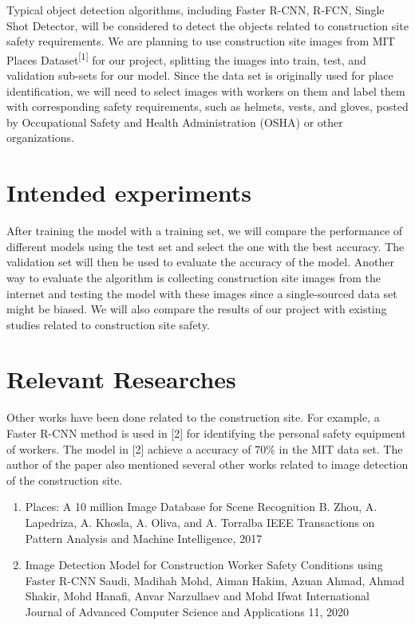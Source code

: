 \documentclass[pdflatex,sn-mathphys]{sn-jnl}%
\begin{document}
Typical object detection algorithms, including Faster R-CNN, R-FCN, Single Shot Detector, will be considered to detect the objects related to construction site safety requirements. We are planning to use construction site images from MIT Places Dataset\textsuperscript{[1]} for our project, splitting the images into train, test, and validation sub-sets for our model. Since the data set is originally used for place identification, we will need to select images with workers on them and label them with corresponding safety requirements, such as helmets, vests, and gloves, posted by Occupational Safety and Health Administration (OSHA) or other organizations. 

\section{Intended experiments}\label{sec3}

 After training the model with a training set, we will compare the performance of different models using the test set and select the one with the best accuracy. The validation set will then be used to evaluate the accuracy of the model. Another way to evaluate the algorithm is collecting construction site images from the internet and testing the model with these images since a single-sourced data set might be biased. We will also compare the results of our project with existing studies related to construction site safety.

\section{Relevant Researches}\label{sec3}

Other works have been done related to the construction site. For example, a Faster R-CNN method is used in [2] for identifying the personal safety equipment of workers. The model in [2] achieve a accuracy of 70\% in the MIT data set. The author of the paper also mentioned several other works related to image detection of the construction site.

\begin{enumerate}

\item
Places: A 10 million Image Database for Scene Recognition
B. Zhou, A. Lapedriza, A. Khosla, A. Oliva, and A. Torralba
IEEE Transactions on Pattern Analysis and Machine Intelligence, 2017

\hfill

\item
Image Detection Model for Construction Worker Safety Conditions using Faster R-CNN
Saudi, Madihah Mohd, Aiman Hakim, Azuan Ahmad, Ahmad Shakir, Mohd Hanafi, Anvar Narzullaev and Mohd Ifwat International Journal of Advanced Computer Science and Applications 11, 2020

\end{enumerate}

\end{document}
